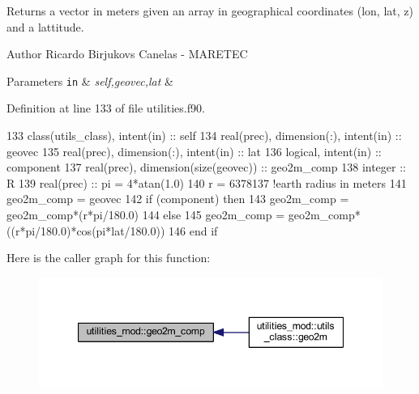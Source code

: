 Returns a vector in meters given an array in geographical coordinates (lon, lat, z) and a lattitude. 

\begin{DoxyAuthor}{Author}
Ricardo Birjukovs Canelas -\/ M\+A\+R\+E\+T\+EC 
\end{DoxyAuthor}

\begin{DoxyParams}[1]{Parameters}
\mbox{\tt in}  & {\em self,geovec,lat} & \\
\hline
\end{DoxyParams}


Definition at line 133 of file utilities.\+f90.


\begin{DoxyCode}
133     \textcolor{keywordtype}{class}(utils\_class), \textcolor{keywordtype}{intent(in)} :: self
134     \textcolor{keywordtype}{real(prec)}, \textcolor{keywordtype}{dimension(:)}, \textcolor{keywordtype}{intent(in)} :: geovec
135     \textcolor{keywordtype}{real(prec)}, \textcolor{keywordtype}{dimension(:)}, \textcolor{keywordtype}{intent(in)} :: lat
136     \textcolor{keywordtype}{logical}, \textcolor{keywordtype}{intent(in)} :: component
137     \textcolor{keywordtype}{real(prec)}, \textcolor{keywordtype}{dimension(size(geovec))} :: geo2m\_comp
138     \textcolor{keywordtype}{integer} :: R
139     \textcolor{keywordtype}{real(prec)} :: pi = 4*atan(1.0)
140     r = 6378137 \textcolor{comment}{!earth radius in meters    }
141     geo2m\_comp = geovec
142     \textcolor{keywordflow}{if} (component) \textcolor{keywordflow}{then}
143         geo2m\_comp = geo2m\_comp*(r*pi/180.0)
144     \textcolor{keywordflow}{else}
145         geo2m\_comp = geo2m\_comp*((r*pi/180.0)*cos(pi*lat/180.0))
146 \textcolor{keywordflow}{    end if}
\end{DoxyCode}
Here is the caller graph for this function\+:\nopagebreak
\begin{figure}[H]
\begin{center}
\leavevmode
\includegraphics[width=347pt]{namespaceutilities__mod_aff2244d9152396064656f20f4936a18c_icgraph}
\end{center}
\end{figure}
\mbox{\label{namespaceutilities__mod_a3d3d0e1568b178cd3e0bb8013642946c}} 

